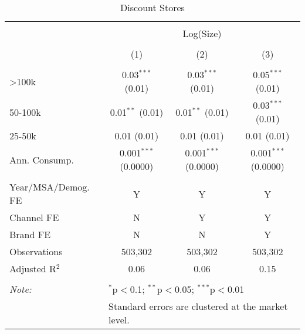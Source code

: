 
\begin{table}[!htbp] \centering 
  \caption{Discount Stores} 
  \label{tab:packageSizeDiscountDetergent} 
\begin{tabular}{@{\extracolsep{5pt}}lccc} 
\\[-1.8ex]\hline 
\hline \\[-1.8ex] 
 & \multicolumn{3}{c}{Log(Size)} \\ 
\\[-1.8ex] & (1) & (2) & (3)\\ 
\hline \\[-1.8ex] 
 >100k & 0.03$^{***}$ (0.01) & 0.03$^{***}$ (0.01) & 0.05$^{***}$ (0.01) \\ 
  50-100k & 0.01$^{**}$ (0.01) & 0.01$^{**}$ (0.01) & 0.03$^{***}$ (0.01) \\ 
  25-50k & 0.01 (0.01) & 0.01 (0.01) & 0.01 (0.01) \\ 
  Ann. Consump. & 0.001$^{***}$ (0.0000) & 0.001$^{***}$ (0.0000) & 0.001$^{***}$ (0.0000) \\ 
 \hline \\[-1.8ex] 
Year/MSA/Demog. FE & Y & Y & Y \\ 
Channel FE & N & Y & Y \\ 
Brand FE & N & N & Y \\ 
Observations & 503,302 & 503,302 & 503,302 \\ 
Adjusted R$^{2}$ & 0.06 & 0.06 & 0.15 \\ 
\hline 
\hline \\[-1.8ex] 
\textit{Note:}  & \multicolumn{3}{l}{$^{*}$p$<$0.1; $^{**}$p$<$0.05; $^{***}$p$<$0.01} \\ 
 & \multicolumn{3}{l}{Standard errors are clustered at the market level.} \\ 
\end{tabular} 
\end{table} 
